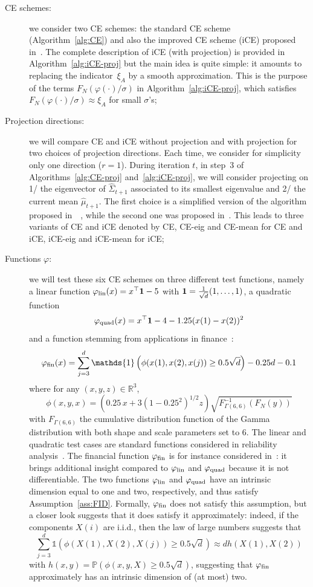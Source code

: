 \documentclass[]{article}
\newcommand{\Indicator}[1]{\mathds{1}\left(#1\right)}
\renewcommand{\P}{\mathbb{P}}
\newcommand{\R}{\mathbb{R}}
\newcommand{\lin}{{\rm lin}}
\newcommand{\quadratic}{{\rm quad}}
\newcommand{\fin}{{\rm fin}}
\newcommand{\one}{{\bf 1}}
\theoremstyle{plain}
\theoremstyle{definition}
\begin{document}
\begin{description}
	\item[CE schemes:] we consider two CE schemes: the standard CE scheme (Algorithm~\ref{alg:CE}) and also the improved CE scheme (iCE) proposed in~\cite{papaioannou_improved_2019}. The complete description of iCE (with projection) is provided in Algorithm~\ref{alg:iCE-proj} but the main idea is quite simple: it amounts to replacing the indicator~$\xi_A$ by a smooth approximation. This is the purpose of the terms $F_N(\varphi(\cdot) / \sigma)$ in Algorithm~\ref{alg:iCE-proj}, which satisfies $F_N(\varphi(\cdot) / \sigma) \approx \xi_A$ for small $\sigma$'s;
	\item[Projection directions:] we will compare CE and iCE without projection and with projection for two choices of projection directions. Each time, we consider for simplicity only one direction ($r = 1$). During iteration $t$, in step~3 of Algorithms~\ref{alg:CE-proj} and~\ref{alg:iCE-proj}, we will consider projecting on 1/ the eigenvector of $\hat \Sigma_{t+1}$ associated to its smallest eigenvalue and 2/ the current mean $\hat \mu_{t+1}$. The first choice is a simplified version of the algorithm proposed in~~\cite{el_masri2024}, while the second one was proposed in~\cite{ELMASRI2021}. This leads to three variants of CE and iCE denoted by CE, CE-eig and CE-mean for CE and iCE, iCE-eig and iCE-mean for iCE;
	\item[Functions $\varphi$:] we will test these six CE schemes on three different test functions, namely a linear function $\varphi_{\lin}(x) = x^\top \one - 5$ with $\one = \frac{1}{\sqrt d} (1, \ldots, 1)$, a quadratic function
	\[ \varphi_{\quadratic}(x) = x^\top \one - 4 - 1.25 (x(1) - x(2))^2 \]
	and a function stemming from applications in finance~\cite{bassamboo_portfolio_2008}:
	\[ \varphi_{\fin}(x) = \sum_{j=3}^d \Indicator{\phi(x(1),x(2),x(j)) \geq 0.5 \sqrt{d}} - 0.25 d - 0.1 \]
	where for any $(x, y, z) \in \R^3$, 
	\[\phi(x,y,x) = \left(0.25 \, x + 3(1 - 0.25^2)^{1/2} z \right) \sqrt{ F_{\Gamma(6,6)}^{-1}\left(F_{N}(y) \right)} \]
	with $F_{\Gamma(6,6)}$ the cumulative distribution function of the Gamma distribution with both shape and scale parameters set to $6$. The linear and quadratic test cases are standard functions considered in reliability analysis~\cite{ELMASRI2021, papaioannou_sequential_2016, PAPAKONSTANTINOU2023, uribe2021}. The financial function $\varphi_\fin$ is for instance considered in~\cite{bassamboo_portfolio_2008, chan_improved_2012, ELMASRI2021}: it brings additional insight compared to $\varphi_\lin$ and $\varphi_\quadratic$ because it is not differentiable. The two functions $\varphi_\lin$ and $\varphi_\quadratic$ have an intrinsic dimension equal to one and two, respectively, and thus satisfy Assumption~\ref{ass:FID}. Formally, $\varphi_\fin$ does not satisfy this assumption, but a closer look suggests that it does satisfy it approximately: indeed, if the components $X(i)$ are i.i.d., then the law of large numbers suggests that
	\[ \sum_{j=3}^d \Indicator{\phi(X(1),X(2),X(j)) \geq 0.5 \sqrt{d}} \approx d h(X(1), X(2)) \]
	 with $h(x,y) = \P(\phi(x,y, X) \geq 0.5 \sqrt d)$, suggesting that $\varphi_\fin$ approximately has an intrinsic dimension of (at most) two.
\end{description}
\end{document}
